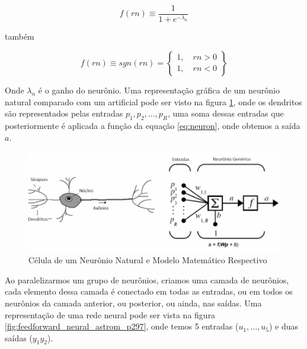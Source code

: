 \begin{equation} \label{eq:neuron}
f(rn) \equiv \frac{1}{1+e^{-\lambda_n}}
\end{equation}

também

\begin{equation}
f(rn) \equiv sgn(rn) = \begin{Bmatrix}  1, \quad rn>0 \\ 1, \quad rn<0  \end{Bmatrix}
\end{equation}

Onde $\lambda_n$ é o ganho do neurônio. Uma representação gráfica de um neurônio natural comparado com um artificial pode ser visto na figura \ref{fig:neuronio_unal_p6}, onde os dendritos são representados pelas entradas $p_1, p_2, ..., p_R$, uma soma dessas entradas que posteriormente é aplicada a função da equação \ref{eq:neuron}, onde obtemos a saída $a$.

\begin{figure}[H]
  \caption{Célula de um Neurônio Natural e Modelo Matemático Respectivo}
    \begin{center}
        \includegraphics[scale=0.45]{referencial/img/neuronio_unal_p6}
  \end{center}
  \label{fig:neuronio_unal_p6}
\end{figure}

Ao paralelizarmos um grupo de neurônios, criamos uma camada de neurônios, cada elemento dessa camada é conectado em todas as entradas, ou em todos os neurônios da camada anterior, ou posterior, ou ainda, nas saídas. Uma representação de uma rede neural pode ser vista na figura \ref{fig:feedforward_neural_astrom_p297}, onde temos 5 entradas ($u_1,...,u_5$) e duas saídas ($y_1 y_2$).

